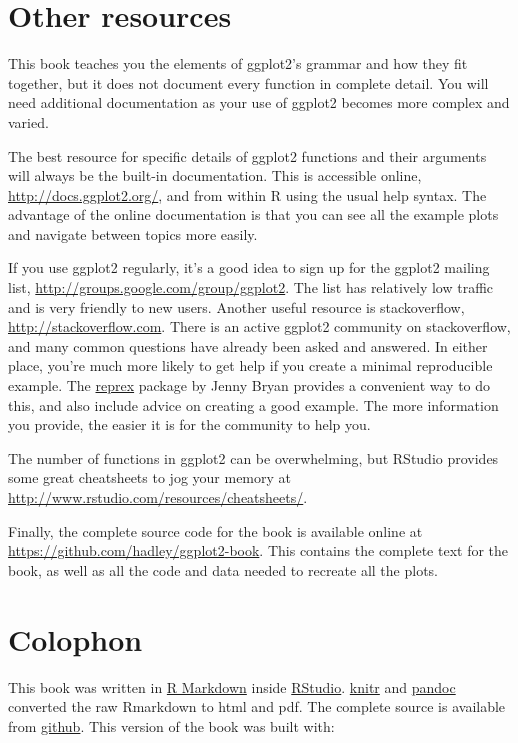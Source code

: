 \hypertarget{sec:other-resources}{%
\section{Other resources}\label{sec:other-resources}}

This book teaches you the elements of ggplot2's grammar and how they fit
together, but it does not document every function in complete detail.
You will need additional documentation as your use of ggplot2 becomes
more complex and varied.

The best resource for specific details of ggplot2 functions and their
arguments will always be the built-in documentation. This is accessible
online, \url{http://docs.ggplot2.org/}, and from within R using the
usual help syntax. The advantage of the online documentation is that you
can see all the example plots and navigate between topics more easily.

If you use ggplot2 regularly, it's a good idea to sign up for the
ggplot2 mailing list, \url{http://groups.google.com/group/ggplot2}. The
list has relatively low traffic and is very friendly to new users.
Another useful resource is stackoverflow,
\url{http://stackoverflow.com}. There is an active ggplot2 community on
stackoverflow, and many common questions have already been asked and
answered. In either place, you're much more likely to get help if you
create a minimal reproducible example. The
\href{https://github.com/jennybc/reprex}{reprex} package by Jenny Bryan
provides a convenient way to do this, and also include advice on
creating a good example. The more information you provide, the easier it
is for the community to help you.

The number of functions in ggplot2 can be overwhelming, but RStudio
provides some great cheatsheets to jog your memory at
\url{http://www.rstudio.com/resources/cheatsheets/}.

Finally, the complete source code for the book is available online at
\url{https://github.com/hadley/ggplot2-book}. This contains the complete
text for the book, as well as all the code and data needed to recreate
all the plots.

\hypertarget{colophon}{%
\section{Colophon}\label{colophon}}

This book was written in \href{http://rmarkdown.rstudio.com/}{R
Markdown} inside \href{http://www.rstudio.com/ide/}{RStudio}.
\href{http://yihui.name/knitr/}{knitr} and
\href{http://johnmacfarlane.net/pandoc/}{pandoc} converted the raw
Rmarkdown to html and pdf. The complete source is available from
\href{https://github.com/hadley/ggplot2-book}{github}. This version of
the book was built with:

